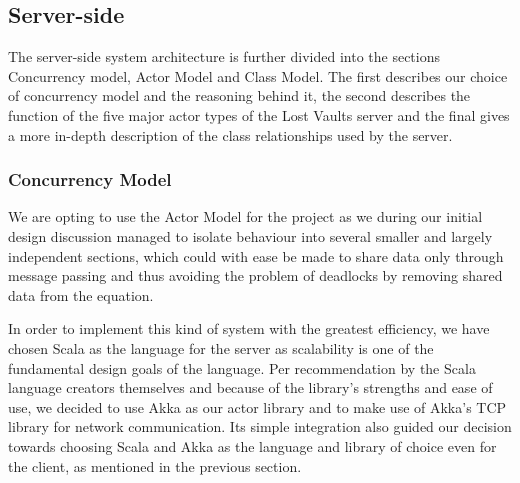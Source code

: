\documentclass[a4paper]{article}
\begin{document}
\subsection{Server-side}
The server-side system architecture is further divided into the sections Concurrency model, Actor Model and Class Model. The first describes our choice of concurrency model and the 
reasoning behind it, the second describes  the function of the five major actor types of the Lost Vaults server and the final gives a more in-depth description of the 
class relationships used by the server.
\subsubsection{Concurrency Model}
We are opting to use the Actor Model for the project as we during our initial design discussion managed to isolate behaviour into several smaller and largely independent sections, 
which could with ease be made to share data only through message passing and thus avoiding the problem of deadlocks by removing shared data from the equation. 

In order to implement this kind of system with the greatest efficiency, we have chosen Scala as the language for the server as scalability is one of the fundamental design goals 
of the language. Per recommendation by the Scala language creators themselves and because of the library's strengths and ease of use, we decided to use Akka as our actor library and to make use of Akka's TCP 
library for network communication. Its simple integration also  guided our decision towards choosing Scala and Akka as the language and library of choice even for the client, as mentioned in the previous section.
\end{document}
